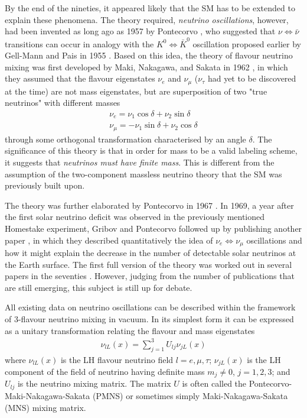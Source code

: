 \documentclass[english]{article}
\begin{document}
    By the end of the nineties, it appeared likely that the SM has to be extended to explain these phenomena. The theory required, \textit{neutrino oscillations}, however, had been invented as long ago as 1957 by Pontecorvo \cite{pontecorvo1957}, who suggested that $\nu \Leftrightarrow \bar{\nu}$ transitions can occur in analogy with the $K^{0} \Leftrightarrow \bar{K}^{0}$ oscillation proposed earlier by Gell-Mann and Pais in 1955 \cite{gellmann1955}. Based on this idea, the theory of flavour neutrino mixing was first developed by Maki, Nakagawa, and Sakata in 1962 \cite{mns1962}, in which they assumed that the flavour eigenstates $\nu_{e}$ and $\nu_{\mu}$ ($\nu_{\tau}$ had yet to be discovered at the time) are not mass eigenstates, but are superposition of two "true neutrinos" with different masses
    \begin{gather}
    	\nu_{e} = \nu_{1} \cos\delta + \nu_{2} \sin\delta \\
        \nu_{\mu} = -\nu_{1} \sin\delta + \nu_{2} \cos\delta
    \end{gather}
    through some orthogonal transformation characterised by an angle $\delta$. The significance of this theory is that in order for mass to be a valid labeling scheme, it suggests that \textit{neutrinos must have finite mass}. This is different from the assumption of the two-component massless neutrino theory that the SM was previously built upon.
    
    The theory was further elaborated by Pontecorvo in 1967 \cite{pontecorvo1967}. In 1969, a year after the first solar neutrino deficit was observed in the previously mentioned Homestake experiment, Gribov and Pontecorvo followed up by publishing another paper \cite{pontecorvo1969}, in which they described quantitatively the idea of $\nu_{e} \Leftrightarrow \nu_{\mu}$ oscillations and how it might explain the decrease in the number of detectable solar neutrinos at the Earth surface. The first full version of the theory was worked out in several papers in the seventies \cite{fulltheory70s}. However, judging from the number of publications that are still emerging, this subject is still up for debate.
    
    All existing data on neutrino oscillations can be described within the
framework of 3-flavour neutrino mixing in vacuum. In its simplest form it can be expressed as a unitary transformation relating the flavour and mass eigenstates
	\begin{gather}
    	\nu_{lL} (x) = \sum_{j=1}^{3} U_{lj} \nu_{jL} (x)
    \end{gather}
    where $\nu_{lL} (x)$ is the LH flavour neutrino field $l=e,\mu,\tau$; $\nu_{jL} (x)$ is the LH component of the field of neutrino having definite mass $m_{j} \neq 0$, $j=1,2,3$; and $U_{lj}$ is the neutrino mixing matrix. The matrix $U$ is often called the Pontecorvo-Maki-Nakagawa-Sakata (PMNS) or sometimes simply Maki-Nakagawa-Sakata (MNS) mixing matrix.
    
\end{document}
